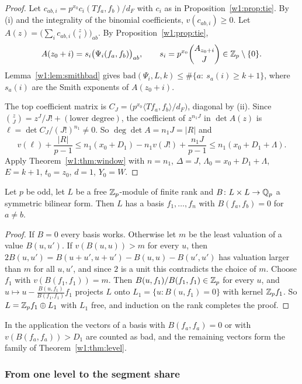 \begin{proof}
Let $c_{ab,i}=p^{x_0}c_i(Tf_a,f_b)/d_F$ with $c_i$ as in Proposition~\ref{w1:prop:tie}. By (i) and the integrality of the binomial coefficients, $v(c_{ab,i})\ge0$. Let $A(z)=\big(\sum_ic_{ab,i}\binom zi\big)_{ab}$. By Proposition~\ref{w1:prop:tie},
\[
A(z_0+i)=s_i\big(\Psi_i(f_a,f_b)\big)_{ab},\qquad s_i=p^{x_0}\binom{A_{z_0+i}}J\in\mathbb Z_p\setminus\{0\}.
\]
Lemma~\ref{w1:lem:smithbad} gives $\mathrm{bad}(\Psi_i,L,k)\le\#\{a:\ s_a(i)\ge k+1\}$, where $s_a(i)$ are the Smith exponents of $A(z_0+i)$.

The top coefficient matrix is $C_J=\big(p^{x_0}\langle Tf_a,f_b\rangle/d_F\big)$, diagonal by (ii). Since $\binom zJ=z^J/J!+(\text{lower degree})$, the coefficient of $z^{n_1J}$ in $\det A(z)$ is $\ell=\det C_J/(J!)^{n_1}\ne0$. So $\deg\det A=n_1J=\lvert R\rvert$ and
\[
v(\ell)+\frac{\lvert R\rvert}{p-1}\le n_1(x_0+D_1)-n_1v(J!)+\frac{n_1J}{p-1}\le n_1(x_0+D_1+\Lambda).
\]
Apply Theorem~\ref{w1:thm:window} with $n=n_1$, $\Delta=J$, $\Lambda_0=x_0+D_1+\Lambda$, $E=k+1$, $t_0=z_0$, $d=1$, $Y_0=W$.
\end{proof}



\begin{lemma}\label{w1:lem:jordan}
Let $p$ be odd, let $L$ be a free $\mathbb Z_p$-module of finite rank and $B\colon L\times L\to\mathbb Q_p$ a symmetric bilinear form. Then $L$ has a basis $f_1,\dots,f_n$ with $B(f_a,f_b)=0$ for $a\ne b$.
\end{lemma}

\begin{proof}
If $B=0$ every basis works. Otherwise let $m$ be the least valuation of a value $B(u,u')$. If $v(B(u,u))>m$ for every $u$, then $2B(u,u')=B(u+u',u+u')-B(u,u)-B(u',u')$ has valuation larger than $m$ for all $u,u'$, and since $2$ is a unit this contradicts the choice of $m$. Choose $f_1$ with $v(B(f_1,f_1))=m$. Then $B(u,f_1)/B(f_1,f_1)\in\mathbb Z_p$ for every $u$, and $u\mapsto u-\frac{B(u,f_1)}{B(f_1,f_1)}f_1$ projects $L$ onto $L_1=\{u:B(u,f_1)=0\}$ with kernel $\mathbb Z_pf_1$. So $L=\mathbb Z_pf_1\oplus L_1$ with $L_1$ free, and induction on the rank completes the proof.
\end{proof}

In the application the vectors of a basis with $B(f_a,f_a)=0$ or with $v(B(f_a,f_a))>D_1$ are counted as bad, and the remaining vectors form the family of Theorem~\ref{w1:thm:level}.

\subsubsection{From one level to the segment share}\label{w1:sec:Crest}

